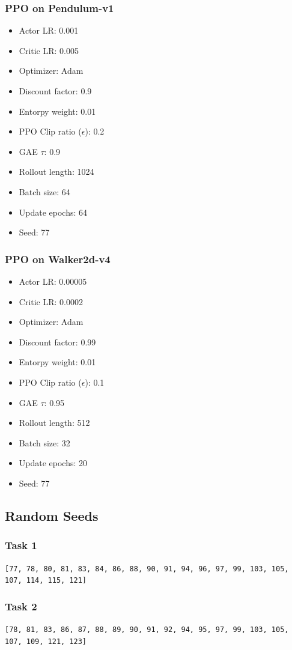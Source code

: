 \documentclass[a4paper,twocolumn]{article}
\begin{document}
\subsubsection{PPO on Pendulum-v1}
\begin{itemize}
	\item Actor LR: 0.001
	\item Critic LR: 0.005
	\item Optimizer: Adam
	\item Discount factor: 0.9
	\item Entorpy weight: 0.01
	\item PPO Clip ratio ($\epsilon$): 0.2
	\item GAE $\tau$: 0.9
	\item Rollout length: 1024
	\item Batch size: 64
	\item Update epochs: 64
	\item Seed: 77
\end{itemize}
\subsubsection{PPO on Walker2d-v4}
\begin{itemize}
	\item Actor LR: 0.00005
	\item Critic LR: 0.0002
	\item Optimizer: Adam
	\item Discount factor: 0.99
	\item Entorpy weight: 0.01
	\item PPO Clip ratio ($\epsilon$): 0.1
	\item GAE $\tau$: 0.95
	\item Rollout length: 512
	\item Batch size: 32
	\item Update epochs: 20
	\item Seed: 77
\end{itemize}

\subsection{Random Seeds}
\subsubsection{Task 1}
\texttt{[77, 78, 80, 81, 83, 84, 86, 88, 90, 91, 94, 96, 97, 99, 103, 105, 107, 114, 115, 121]}
\subsubsection{Task 2}
\texttt{[78, 81, 83, 86, 87, 88, 89, 90, 91, 92, 94, 95, 97, 99, 103, 105, 107, 109, 121, 123]}
\end{document}
